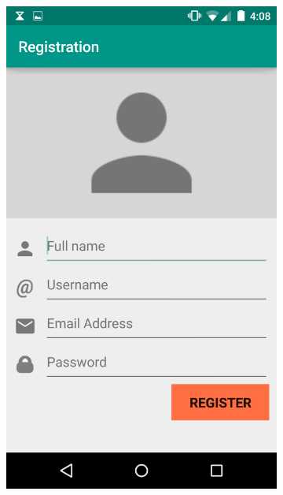 \documentclass[11pt,english,numbers=endperiod,parskip=half]{scrartcl}
\begin{document}
  \begin{figure}[H]
    \centering
    \begin{subfigure}{.5\textwidth}
      \centering
      \includegraphics[width=.7\linewidth]{images/ss5.png}
    \end{subfigure}%
    \begin{subfigure}{.5\textwidth}
      \centering

\end{subfigure}
\end{figure}
\end{document}
